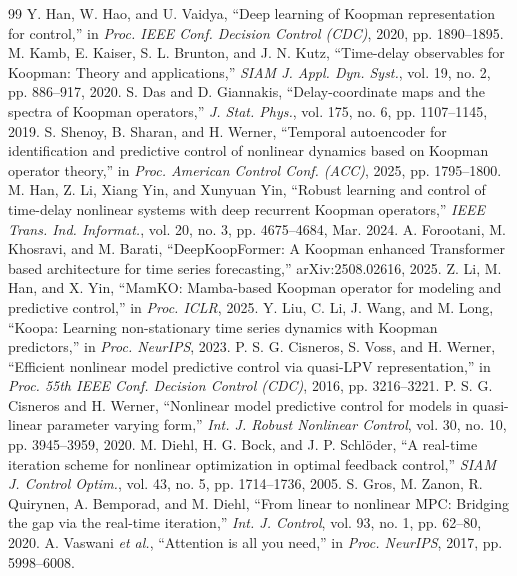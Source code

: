 \documentclass[journal]{IEEEtran}
\begin{document}
\begin{thebibliography}{99}
Y. Han, W. Hao, and U. Vaidya, ``Deep learning of Koopman representation for control,'' in \emph{Proc. IEEE Conf. Decision Control (CDC)}, 2020, pp. 1890--1895.
M. Kamb, E. Kaiser, S. L. Brunton, and J. N. Kutz, ``Time-delay observables for Koopman: Theory and applications,'' \emph{SIAM J. Appl. Dyn. Syst.}, vol. 19, no. 2, pp. 886--917, 2020.
S. Das and D. Giannakis, ``Delay-coordinate maps and the spectra of Koopman operators,'' \emph{J. Stat. Phys.}, vol. 175, no. 6, pp. 1107--1145, 2019.
S. Shenoy, B. Sharan, and H. Werner, ``Temporal autoencoder for identification and predictive control of nonlinear dynamics based on Koopman operator theory,'' in \emph{Proc. American Control Conf. (ACC)}, 2025, pp. 1795--1800.
M. Han, Z. Li, Xiang Yin, and Xunyuan Yin, ``Robust learning and control of time-delay nonlinear systems with deep recurrent Koopman operators,'' \emph{IEEE Trans. Ind. Informat.}, vol. 20, no. 3, pp. 4675--4684, Mar. 2024.
A. Forootani, M. Khosravi, and M. Barati, ``DeepKoopFormer: A Koopman enhanced Transformer based architecture for time series forecasting,'' arXiv:2508.02616, 2025.
Z. Li, M. Han, and X. Yin, ``MamKO: Mamba-based Koopman operator for modeling and predictive control,'' in \emph{Proc. ICLR}, 2025.
Y. Liu, C. Li, J. Wang, and M. Long, ``Koopa: Learning non-stationary time series dynamics with Koopman predictors,'' in \emph{Proc. NeurIPS}, 2023.
P. S. G. Cisneros, S. Voss, and H. Werner, ``Efficient nonlinear model predictive control via quasi-LPV representation,'' in \emph{Proc. 55th IEEE Conf. Decision Control (CDC)}, 2016, pp. 3216--3221.
P. S. G. Cisneros and H. Werner, ``Nonlinear model predictive control for models in quasi-linear parameter varying form,'' \emph{Int. J. Robust Nonlinear Control}, vol. 30, no. 10, pp. 3945--3959, 2020.
M. Diehl, H. G. Bock, and J. P. Schl\"oder, ``A real-time iteration scheme for nonlinear optimization in optimal feedback control,'' \emph{SIAM J. Control Optim.}, vol. 43, no. 5, pp. 1714--1736, 2005.
S. Gros, M. Zanon, R. Quirynen, A. Bemporad, and M. Diehl, ``From linear to nonlinear MPC: Bridging the gap via the real-time iteration,'' \emph{Int. J. Control}, vol. 93, no. 1, pp. 62--80, 2020.
A. Vaswani \emph{et al.}, ``Attention is all you need,'' in \emph{Proc. NeurIPS}, 2017, pp. 5998--6008.
\end{thebibliography}
\end{document}
